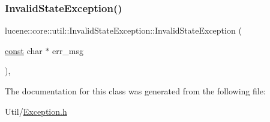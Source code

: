 \subsubsection{\texorpdfstring{Invalid\+State\+Exception()}{InvalidStateException()}\hspace{0.1cm}{\footnotesize\ttfamily [3/3]}}
{\footnotesize\ttfamily lucene\+::core\+::util\+::\+Invalid\+State\+Exception\+::\+Invalid\+State\+Exception (\begin{DoxyParamCaption}\item[{\mbox{\hyperlink{ZlibCrc32_8h_a2c212835823e3c54a8ab6d95c652660e}{const}} char $\ast$}]{err\+\_\+msg }\end{DoxyParamCaption})\hspace{0.3cm}{\ttfamily [inline]}, {\ttfamily [explicit]}}



The documentation for this class was generated from the following file\+:\begin{DoxyCompactItemize}
\item 
Util/\mbox{\hyperlink{Util_2Exception_8h}{Exception.\+h}}\end{DoxyCompactItemize}
